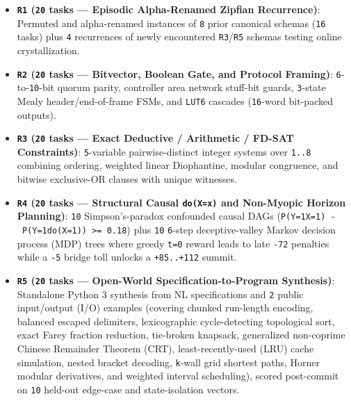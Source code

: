 \documentclass[10pt,letterpaper]{article}
\providecommand{\tightlist}{\setlength{\itemsep}{1pt}\setlength{\parskip}{0pt}}
\begin{document}
\begin{itemize}
\tightlist
\item
  \textbf{\texttt{R1} (\texttt{20} tasks --- Episodic Alpha-Renamed
  Zipfian Recurrence)}: Permuted and alpha-renamed instances of
  \texttt{8} prior canonical schemas (\texttt{16} tasks) plus \texttt{4}
  recurrences of newly encountered \texttt{R3}/\allowbreak{}\texttt{R5} schemas
  testing online crystallization.
\item
  \textbf{\texttt{R2} (\texttt{20} tasks --- Bitvector, Boolean Gate,
  and Protocol Framing)}: \texttt{6}-to-\texttt{10}-bit quorum parity,
  controller area network stuff-bit guards, \texttt{3}-state Mealy
  header/end-of-frame FSMs, and \texttt{LUT6} cascades (\texttt{16}-word
  bit-packed outputs).
\item
  \textbf{\texttt{R3} (\texttt{20} tasks --- Exact Deductive /
  Arithmetic / FD-SAT Constraints)}: \texttt{5}-variable
  pairwise-distinct integer systems over \texttt{1..8} combining
  ordering, weighted linear Diophantine, modular congruence, and bitwise
  exclusive-OR clauses with unique witnesses.
\item
  \textbf{\texttt{R4} (\texttt{20} tasks --- Structural Causal
  \texttt{do(X=x)} and Non-Myopic Horizon Planning)}: \texttt{10}
  Simpson's-paradox confounded causal DAGs
  (\texttt{\textbar{}P(Y=1\textbar{}X=1)\ -\ P(Y=1\textbar{}do(X=1))\textbar{}\ \textgreater{}=\ 0.18})
  plus \texttt{10} \texttt{6}-step deceptive-valley Markov decision
  process (MDP) trees where greedy \texttt{t=0} reward leads to late
  \texttt{-72} penalties while a \texttt{-5} bridge toll unlocks a
  \texttt{+85..+112} summit.
\item
  \textbf{\texttt{R5} (\texttt{20} tasks --- Open-World
  Specification-to-Program Synthesis)}: Standalone Python 3 synthesis
  from NL specifications and \texttt{2} public input/output (I/O)
  examples (covering chunked run-length encoding, balanced escaped
  delimiters, lexicographic cycle-detecting topological sort, exact
  Farey fraction reduction, tie-broken knapsack, generalized non-coprime
  Chinese Remainder Theorem (CRT), least-recently-used (LRU) cache
  simulation, nested bracket decoding, \texttt{k}-wall grid shortest
  paths, Horner modular derivatives, and weighted interval scheduling),
  scored post-commit on \texttt{10} held-out edge-case and
  state-isolation vectors.
\end{itemize}
\end{document}
